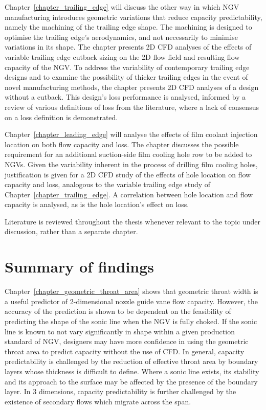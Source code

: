 \documentclass[a4paper, 11pt, oneside]{report}
\begin{document}
Chapter~\ref{chapter_trailing_edge} will discuss the other way in which NGV manufacturing introduces geometric variations that reduce capacity predictability, namely the machining of the trailing edge shape. The machining is designed to optimise the trailing edge's aerodynamics, and not necessarily to minimise variations in its shape. The chapter presents 2D CFD analyses of the effects of variable trailing edge cutback sizing on the 2D flow field and resulting flow capacity of the NGV. To address the variability of contemporary trailing edge designs and to examine the possibility of thicker trailing edges in the event of novel manufacturing methods, the chapter presents 2D CFD analyses of a design without a cutback. This design's loss performance is analysed, informed by a review of various definitions of loss from the literature, where a lack of consensus on a loss definition is demonstrated.

Chapter~\ref{chapter_leading_edge} will analyse the effects of film coolant injection location on both flow capacity and loss. The chapter discusses the possible requirement for an additional suction-side film cooling hole row to be added to NGVs. Given the variability inherent in the process of drilling film cooling holes, justification is given for a 2D CFD study of the effects of hole location on flow capacity and loss, analogous to the variable trailing edge study of Chapter~\ref{chapter_trailing_edge}. A correlation between hole location and flow capacity is analysed, as is the hole location's effect on loss. %

Literature is reviewed throughout the thesis whenever relevant to the topic under discussion, rather than a separate chapter.

\section{Summary of findings}

Chapter~\ref{chapter_geometric_throat_area} shows that geometric throat width is a useful predictor of 2-dimensional nozzle guide vane flow capacity. However, the accuracy of the prediction is shown to be dependent on the feasibility of predicting the shape of the sonic line when the NGV is fully choked. If the sonic line is known to not vary significantly in shape within a given production standard of NGV, designers may have more confidence in using the geometric throat area to predict capacity without the use of CFD. In general, capacity predictability is challenged by the reduction of effective throat area by boundary layers whose thickness is difficult to define. Where a sonic line exists, its stability and its approach to the surface may be affected by the presence of the boundary layer. In 3 dimensions, capacity predictability is further challenged by the existence of secondary flows which migrate across the span.
\end{document}
